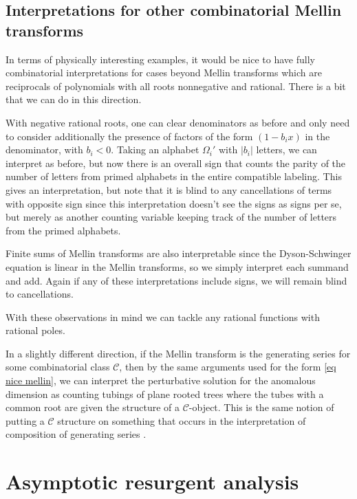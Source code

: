 \documentclass[oneside]{amsart}
\theoremstyle{definition}
\begin{document}
\subsection{Interpretations for other combinatorial Mellin transforms}

In terms of physically interesting examples, it would be nice to have fully combinatorial interpretations for cases beyond Mellin transforms which are reciprocals of polynomials with all roots nonnegative and rational.  There is a bit that we can do in this direction.

With negative rational roots, one can clear denominators as before and only need to consider additionally the presence of factors of the form $(1-b_ix)$ in the denominator, with $b_i<0$. Taking an alphabet $\Omega_i'$ with $|b_i|$ letters, we can interpret as before, but now there is an overall sign that counts the parity of the number of letters from primed alphabets in the entire compatible labeling.  This gives an interpretation, but note that it is blind to any cancellations of terms with opposite sign since this interpretation doesn't see the signs as signs per se, but merely as another counting variable keeping track of the number of letters from the primed alphabets.

Finite sums of Mellin transforms are also interpretable since the Dyson-Schwinger equation is linear in the Mellin transforms, so we simply interpret each summand and add.  Again if any of these interpretations include signs, we will remain blind to cancellations.

With these observations in mind we can tackle any rational functions with rational poles.

\medskip

In a slightly different direction, if the Mellin transform is the generating series for some combinatorial class $\mathcal{C}$, then by the same arguments used for the form \eqref{eq nice mellin}, we can interpret the perturbative solution for the anomalous dimension as counting tubings of plane rooted trees where the tubes with a common root are given the structure of a $\mathcal{C}$-object.  This is the same notion of putting a $\mathcal{C}$ structure on something that occurs in the interpretation of composition of generating series \cite[Part.~A]{FS}.  %

\section{Asymptotic resurgent analysis}
\label{sec:asymptotics}
\end{document}
